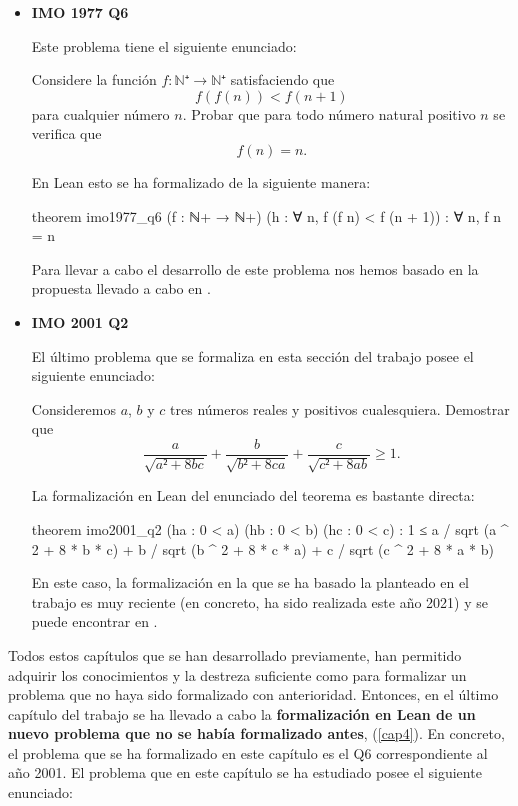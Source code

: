 \begin{itemize}
\item \textbf{IMO 1977 Q6}

  Este problema tiene el siguiente enunciado:

  Considere la función
  \(f:ℕ⁺ → ℕ⁺\) satisfaciendo que
  \[f(f(n)) < f(n+1)\]
  para cualquier número \(n\). Probar que para todo número
  natural positivo \(n\) se verifica que
  \[f(n) = n.\]

  En Lean esto se ha formalizado de la siguiente manera:
  \begin{leancode}
  theorem imo1977_q6
    (f : ℕ+ → ℕ+)
    (h : ∀ n, f (f n) < f (n + 1))
    : ∀ n, f n = n
  \end{leancode}
    
  Para llevar a cabo el desarrollo de este problema nos hemos basado en la
  propuesta llevado a cabo en \cite{TC}.


\item \textbf{IMO 2001 Q2}

  El último problema que se formaliza en esta sección del trabajo posee el
  siguiente enunciado:

  Consideremos \(a\), \(b\) y \(c\) tres números reales y positivos
  cualesquiera. Demostrar que
  \begin{equation*}
    \frac{a}{\sqrt{a²+8bc}} +
    \frac{b}{\sqrt{b²+8ca}} +
    \frac{c}{\sqrt{c²+8ab}} ≥ 1.
  \end{equation*}

  La formalización en Lean del enunciado del teorema es bastante directa:

  \begin{leancode}
  theorem imo2001_q2
    (ha : 0 < a)
    (hb : 0 < b)
    (hc : 0 < c)
    : 1 ≤ a / sqrt (a ^ 2 + 8 * b * c) +
          b / sqrt (b ^ 2 + 8 * c * a) +
          c / sqrt (c ^ 2 + 8 * a * b)
  \end{leancode}
      
  En este caso, la formalización en la que se ha basado la planteado
  en el trabajo es muy reciente (en concreto, ha sido realizada este año 2021)
  y se puede encontrar en \cite{TCC}.
\end{itemize}

Todos estos capítulos que se han desarrollado previamente, han permitido
adquirir los conocimientos y la destreza suficiente como para formalizar un
problema que no haya sido formalizado con anterioridad. Entonces, en el último
capítulo del trabajo se ha llevado a cabo la \textbf{
formalización en Lean de un nuevo problema que no se había formalizado antes},
(\ref{cap4}). En concreto, el problema que se ha formalizado en este capítulo es
el Q6 correspondiente al año 2001. El problema que en este capítulo se ha
estudiado posee el siguiente enunciado:

